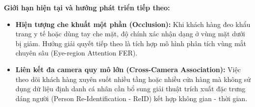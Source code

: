 \noindent \textbf{Giới hạn hiện tại và hướng phát triển tiếp theo:}
\begin{itemize}
    \item \textbf{Hiện tượng che khuất một phần (Occlusion):} Khi khách hàng đeo khẩu trang y tế hoặc dùng tay che mặt, độ chính xác nhận dạng ở vùng mặt dưới bị giảm. Hướng giải quyết tiếp theo là tích hợp mô hình phân tích vùng mắt chuyên sâu (Eye-region Attention FER).
    \item \textbf{Liên kết đa camera quy mô lớn (Cross-Camera Association):} Việc theo dõi khách hàng xuyên suốt nhiều tầng hoặc nhiều cửa hàng mà không sử dụng dữ liệu định danh cá nhân cần bổ sung giải thuật trích xuất đặc trưng dáng người (Person Re-Identification - ReID) kết hợp không gian - thời gian.
\end{itemize}

\newpage
